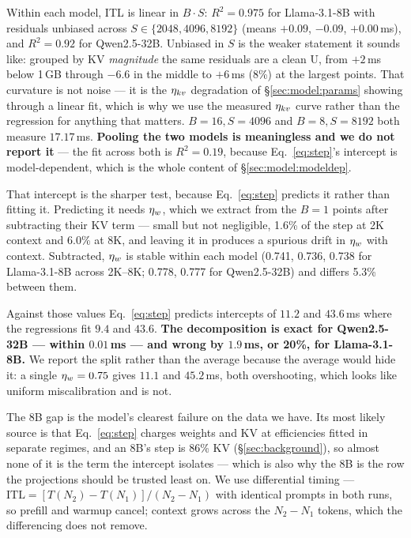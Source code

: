 Within each model, ITL is linear in $B\cdot S$: $R^2 = 0.975$ for Llama-3.1-8B
with residuals unbiased across $S \in \{2048, 4096, 8192\}$ (means $+0.09$,
$-0.09$, $+0.00$\,ms), and $R^2 = 0.92$ for Qwen2.5-32B. Unbiased in $S$ is the
weaker statement it sounds like: grouped by KV \emph{magnitude} the same
residuals are a clean U, from $+2$\,ms below 1\,GB through $-6.6$ in the middle
to $+6$\,ms (8\%) at the largest points. That curvature is not noise --- it is
the $\eta_{kv}$ degradation of \S\ref{sec:model:params} showing through a linear
fit, which is why we use the measured $\eta_{kv}$ curve rather than the regression
for anything that matters. $B{=}16,S{=}4096$ and
$B{=}8,S{=}8192$ both measure $17.17$\,ms. \textbf{Pooling the two models is
meaningless and we do not report it} --- the fit across both is $R^2 = 0.19$,
because Eq.~\ref{eq:step}'s intercept is model-dependent, which is the whole
content of \S\ref{sec:model:modeldep}.

That intercept is the sharper test, because Eq.~\ref{eq:step} predicts it rather
than fitting it. Predicting it needs $\eta_w$, which we extract from the $B{=}1$
points after subtracting their KV term --- small but not negligible, 1.6\% of
the step at 2K context and 6.0\% at 8K, and leaving it in produces a spurious
drift in $\eta_w$ with context. Subtracted, $\eta_w$ is stable within each model
(0.741, 0.736, 0.738 for Llama-3.1-8B across 2K--8K; 0.778, 0.777 for
Qwen2.5-32B) and differs 5.3\% between them.

Against those values Eq.~\ref{eq:step} predicts intercepts of $11.2$ and
$43.6$\,ms where the regressions fit $9.4$ and $43.6$. \textbf{The decomposition
is exact for Qwen2.5-32B --- within $0.01$\,ms --- and wrong by $1.9$\,ms, or
20\%, for Llama-3.1-8B.} We report the split rather than the average because the
average would hide it: a single $\eta_w = 0.75$ gives $11.1$ and $45.2$\,ms, both
overshooting, which looks like uniform miscalibration and is not.

The 8B gap is the model's clearest failure on the data we have. Its most likely
source is that Eq.~\ref{eq:step} charges weights and KV at efficiencies fitted
in separate regimes, and an 8B's step is 86\% KV (\S\ref{sec:background}), so
almost none of it is the term the intercept isolates --- which is also why the
8B is the row the projections should be trusted least on.
We use differential timing --- $\mathrm{ITL} = [T(N_2) - T(N_1)]/(N_2 - N_1)$
with identical prompts in both runs, so prefill and warmup cancel; context
grows across the $N_2-N_1$ tokens, which the differencing does not remove.


